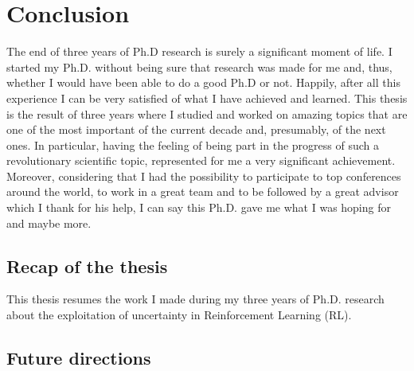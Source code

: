 \chapter{Conclusion}
The end of three years of Ph.D research is surely a significant moment of life. I started my Ph.D. without being sure that research was made for me and, thus, whether I would have been able to do a good Ph.D or not. Happily, after all this experience I can be very satisfied of what I have achieved and learned.
This thesis is the result of three years where I studied and worked on amazing topics that are one of the most important of the current decade and, presumably, of the next ones. In particular, having the feeling of being part in the progress of such a revolutionary scientific topic, represented for me a very significant achievement. Moreover, considering that I had the possibility to participate to top conferences around the world, to work in a great team and to be followed by a great advisor which I thank for his help, I can say this Ph.D. gave me what I was hoping for and maybe more.

\section{Recap of the thesis}
This thesis resumes the work I made during my three years of Ph.D. research about the exploitation of uncertainty in Reinforcement Learning (RL). 

\section{Future directions}
